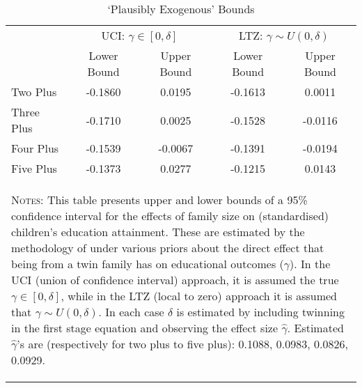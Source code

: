 \begin{table}[htpb!]\caption{`Plausibly Exogenous' Bounds} 
\label{TWINtab:Conley}\begin{center}\begin{tabular}{lcccc}
\toprule \toprule 
&\multicolumn{2}{c}{UCI: $\gamma\in [0,\delta]$}&\multicolumn{2}{c}{LTZ: $\gamma \sim U(0,\delta)$}\\ 
\cmidrule(r){2-3} \cmidrule(r){4-5}
&Lower Bound&Upper Bound&Lower Bound&Upper Bound\\
Two Plus&-0.1860&0.0195&-0.1613&0.0011\\
Three Plus&-0.1710&0.0025&-0.1528&-0.0116\\
Four Plus&-0.1539&-0.0067&-0.1391&-0.0194\\
Five Plus&-0.1373&0.0277&-0.1215&0.0143\\
\midrule\multicolumn{5}{p{11.6cm}}{\begin{footnotesize}\textsc{Notes:} This table presents upper and lower bounds of a 95\% confidence interval for the effects of family size on (standardised) children's education attainment. These are estimated by the methodology of \citet{Conleyetal2012}  under various priors about the direct effect that being from a twin family has on educational outcomes ($\gamma$). In the UCI (union of confidence interval) approach, it is assumed the true $\gamma\in[0,\delta]$, while in the LTZ (local to zero) approach it is assumed that $\gamma\sim U(0,\delta)$.  In each case $\delta$ is estimated by including twinning in the first stage  equation and observing the effect size $\hat\gamma$.  Estimated $\hat\gamma$'s are (respectively for two plus to five plus):   0.1088, 0.0983, 0.0826, 0.0929.\end{footnotesize}}  
\\ \bottomrule \end{tabular}\end{center}\end{table} 
